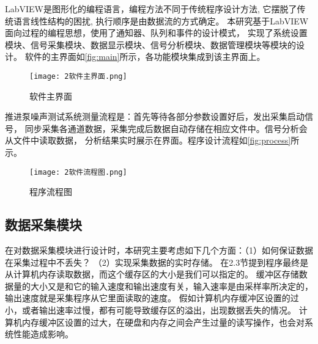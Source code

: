 LabVIEW是图形化的编程语言，编程方法不同于传统程序设计方法, 它摆脱了传统语言线性结构的困扰, 
执行顺序是由数据流的方式确定。
本研究基于LabVIEW面向过程的编程思想，使用了通知器、队列和事件的设计模式，
实现了系统设置模块、信号采集模块、数据显示模块、信号分析模块、数据管理模块等模块的设计。
软件的主界面如\autoref{fig:main}所示，各功能模块集成到该主界面上。
\begin{figure}[htbp]
    \centering
    \texttt{[image: 2软件主界面.png]}
    \caption{\label{fig:main}软件主界面}
\end{figure}

推进泵噪声测试系统测量流程是：首先等待各部分参数设置好后，发出采集启动信号，
同步采集各通道数据，采集完成后数据自动存储在相应文件中。信号分析会从文件中读取数据，
分析结果实时展示在界面。程序设计流程如\autoref{fig:process}所示。
\begin{figure}[htbp]
    \centering
    \texttt{[image: 2软件流程图.png]}
    \caption{\label{fig:process}程序流程图}
\end{figure}

\begin{comment}
\subsection{系统设置模块}
软件界面的设置模块提供了测试系统各项参数设定，包括采集通道设置、采样参数设置、
传感器灵敏度设置、分析参数设置等。
\begin{figure}[htbp]
    \centering
    \texttt{[image: 2系统设置.png]}
    \caption{\label{fig:setting}系统设置}
\end{figure}
\end{comment}

\subsection{数据采集模块}
在对数据采集模块进行设计时，本研究主要考虑如下几个方面：（1）如何保证数据在采集过程中不丢失？
（2）实现采集数据的实时存储。
在2.3节提到程序最终是从计算机内存读取数据，而这个缓存区的大小是我们可以指定的。
缓冲区存储数据量的大小又是和它的输入速度和输出速度有关，输入速率是由采样率所决定的，
输出速度就是采集程序从它里面读取的速度。
假如计算机内存缓冲区设置的过小，或者输出速率过慢，都有可能导致缓存区的溢出，出现数据丢失的情况。
计算机内存缓冲区设置的过大，在硬盘和内存之间会产生过量的读写操作，也会对系统性能造成影响。

